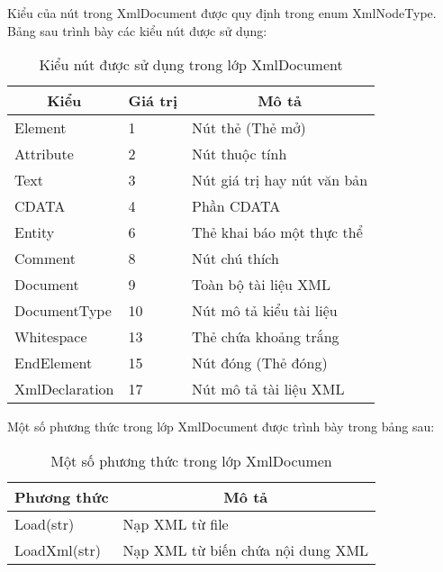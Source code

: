 Kiểu của nút trong XmlDocument được quy định trong enum XmlNodeType. Bảng sau trình bày các kiểu nút được sử dụng:

\begin{center}
\begin{longtable}{|m{3cm}|m{2cm}| m{6cm}|}
\caption[Kiểu nút được sử dụng trong lớp XmlDocument]{Kiểu nút được sử dụng trong lớp XmlDocument}
   \endfirsthead
   \endhead
\hline
\multicolumn{1}{|c|}{\textbf{Kiểu}} &	\multicolumn{1}{c|}{\textbf{Giá trị}} &	\multicolumn{1}{c|}{\textbf{Mô tả}}\\ \hline
Element &	1 &	Nút thẻ (Thẻ mở) \\ \hline
Attribute &	2 &	Nút thuộc tính\\ \hline
Text &	3 &	Nút giá trị hay nút văn bản\\ \hline
CDATA &	4 &	Phần CDATA\\ \hline
Entity &	6 &	Thẻ khai báo một thực thể\\ \hline
Comment &	8 &	Nút chú thích\\ \hline
Document &	9 &	Toàn bộ tài liệu XML\\ \hline
DocumentType &	10 &	Nút mô tả kiểu tài liệu\\ \hline
Whitespace &	13 &	Thẻ chứa khoảng trắng\\ \hline
EndElement &	15 &	Nút đóng (Thẻ đóng)	\\ \hline
XmlDeclaration &	17 &	Nút mô tả tài liệu XML\\ \hline

\end{longtable}
\end{center}
\vspace{-1cm}

Một số phương thức trong lớp XmlDocument được trình bày trong bảng sau:

\begin{center}
\begin{longtable}{|m{3cm}|m{6cm}|}
\caption[Một số phương thức trong lớp XmlDocumen]{Một số phương thức trong lớp XmlDocumen}
   \endfirsthead
   \endhead
\hline
\multicolumn{1}{|c|}{\textbf{Phương thức}} &	\multicolumn{1}{c|}{\textbf{Mô tả}}\\ \hline
Load(str)&	Nạp XML từ file\\ \hline
LoadXml(str)&	Nạp XML từ biến chứa nội dung XML\\ \hline

\end{longtable}
\end{center}
\vspace{-1cm}

